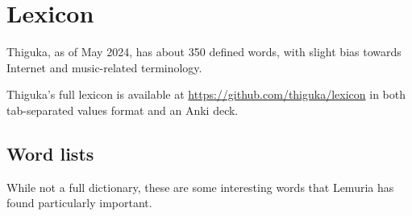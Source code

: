 
\chapter{Lexicon}
Thiguka, as of May 2024, has about 350 defined words, with slight bias towards Internet and music-related terminology.

Thiguka's full lexicon is available at \url{https://github.com/thiguka/lexicon} in both tab-separated values format and an Anki deck.

\section{Word lists}
While not a full dictionary, these are some interesting words that Lemuria has found particularly important.






